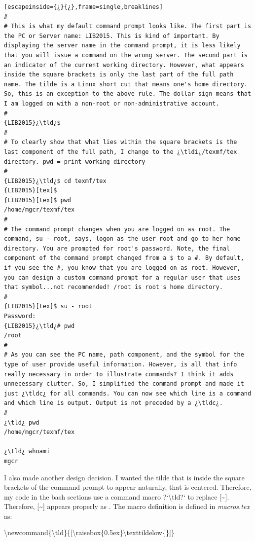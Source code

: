 \begin{lstlisting}[escapeinside={¿}{¿},frame=single,breaklines]
#
# This is what my default command prompt looks like. The first part is the PC or Server name: LIB2015. This is kind of important. By displaying the server name in the command prompt, it is less likely that you will issue a command on the wrong server. The second part is an indicator of the current working directory. However, what appears inside the square brackets is only the last part of the full path name. The tilde is a Linux short cut that means one's home directory. So, this is an exception to the above rule. The dollar sign means that I am logged on with a non-root or non-administrative account.
#
{LIB2015}¿\tld¿$
#
# To clearly show that what lies within the square brackets is the last component of the full path, I change to the ¿\tldi¿/texmf/tex directory. pwd = print working directory
#
{LIB2015}¿\tld¿$ cd texmf/tex
{LIB2015}[tex]$  
{LIB2015}[tex]$ pwd
/home/mgcr/texmf/tex
#
# The command prompt changes when you are logged on as root. The command, su - root, says, logon as the user root and go to her home directory. You are prompted for root's password. Note, the final component of the command prompt changed from a $ to a #. By default, if you see the #, you know that you are logged on as root. However, you can design a custom command prompt for a regular user that uses that symbol...not recommended! /root is root's home directory.
#
{LIB2015}[tex]$ su - root
Password: 
{LIB2015}¿\tld¿# pwd
/root
#
# As you can see the PC name, path component, and the symbol for the type of user provide useful information. However, is all that info really necessary in order to illustrate commands? I think it adds unnecessary clutter. So, I simplified the command prompt and made it just ¿\tldc¿ for all commands. You can now see which line is a command and which line is output. Output is not preceded by a ¿\tldc¿.
#
¿\tld¿ pwd
/home/mgcr/texmf/tex

¿\tld¿ whoami
mgcr	
\end{lstlisting}

I also made another \latex design decision. I wanted the tilde that is inside the square brackets of the command prompt to appear naturally, that is centered. Therefore, my \latex code in the bash sections use a command macro {?`}\textbackslash{}tld{?`} to replace [\textasciitilde{}]. Therefore, [\textasciitilde{}] appears properly as \tld. The macro definition is defined in \textsl{macros.tex} as:

\textbackslash{}newcommand\{\textbackslash{}tld\}\{[\textbackslash{}raisebox\{0.5ex\}\textbackslash{}texttildelow\{\}]\}

